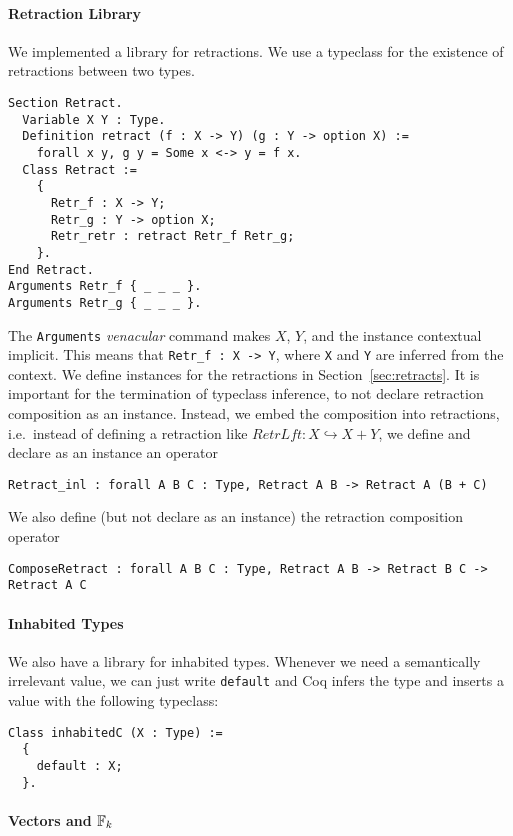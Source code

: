 \paragraph{Retraction Library}

We implemented a library for retractions.  We use a typeclass for the existence of retractions between two types.
\begin{lstlisting}
Section Retract.
  Variable X Y : Type.
  Definition retract (f : X -> Y) (g : Y -> option X) :=
    forall x y, g y = Some x <-> y = f x.
  Class Retract :=
    {
      Retr_f : X -> Y;
      Retr_g : Y -> option X;
      Retr_retr : retract Retr_f Retr_g;
    }.
End Retract.
Arguments Retr_f { _ _ _ }.
Arguments Retr_g { _ _ _ }.
\end{lstlisting}
The \lstinline!Arguments! \textit{venacular} command makes $X$, $Y$, and the instance contextual implicit.  This means that
\lstinline!Retr_f : X -> Y!, where \lstinline!X! and \lstinline!Y! are inferred from the context.  We define instances for the retractions in
Section~\ref{sec:retracts}.  It is important for the termination of typeclass inference, to not declare retraction composition as an instance.
Instead, we embed the composition into retractions, i.e.\ instead of defining a retraction like $RetrLft : X \hookrightarrow X+Y$, we define and
declare as an instance an operator
\begin{lstlisting}
Retract_inl : forall A B C : Type, Retract A B -> Retract A (B + C)
\end{lstlisting}
We also define (but not declare as an instance) the retraction composition operator
\begin{lstlisting}
ComposeRetract : forall A B C : Type, Retract A B -> Retract B C -> Retract A C
\end{lstlisting}

\paragraph{Inhabited Types}

We also have a library for inhabited types.  Whenever we need a semantically irrelevant value, we can just write \lstinline!default! and Coq infers
the type and inserts a value with the following typeclass:
\begin{lstlisting}
Class inhabitedC (X : Type) :=
  {
    default : X;
  }.
\end{lstlisting}

\paragraph{Vectors and $\mathbb{F}_k$}


